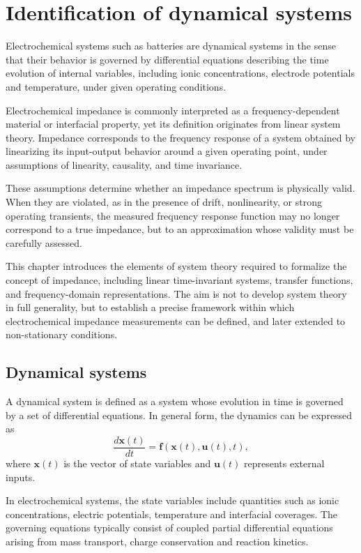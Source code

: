 \chapter{Identification of dynamical systems}
\label{ch:system_identification}

Electrochemical systems such as batteries are dynamical systems in the sense that their behavior is governed by differential equations describing the time evolution of internal variables, including ionic concentrations, electrode potentials and temperature, under given operating conditions.

Electrochemical impedance is commonly interpreted as a frequency-dependent material or interfacial property, yet its definition originates from linear system theory.
Impedance corresponds to the frequency response of a system obtained by linearizing its input-output behavior around a given operating point, under assumptions of linearity, causality, and time invariance.

These assumptions determine whether an impedance spectrum is physically valid.
When they are violated, as in the presence of drift, nonlinearity, or strong operating transients, the measured frequency response function may no longer correspond to a true impedance, but to an approximation whose validity must be carefully assessed.

This chapter introduces the elements of system theory required to formalize the concept of impedance, including linear time-invariant systems, transfer functions, and frequency-domain representations.
The aim is not to develop system theory in full generality, but to establish a precise framework within which electrochemical impedance measurements can be defined, and later extended to non-stationary conditions.

\section{Dynamical systems}

A dynamical system is defined as a system whose evolution in time is governed by a set of differential equations.
In general form, the dynamics can be expressed as
\begin{equation}
    \frac{d\mathbf{x}(t)}{dt} = \mathbf{f}\!\left(\mathbf{x}(t), \mathbf{u}(t), t\right),
\end{equation}
where $\mathbf{x}(t)$ is the vector of state variables and $\mathbf{u}(t)$ represents external inputs.

In electrochemical systems, the state variables include quantities such as ionic concentrations, electric potentials, temperature and interfacial coverages.
The governing equations typically consist of coupled partial differential equations arising from mass transport, charge conservation and reaction kinetics.


